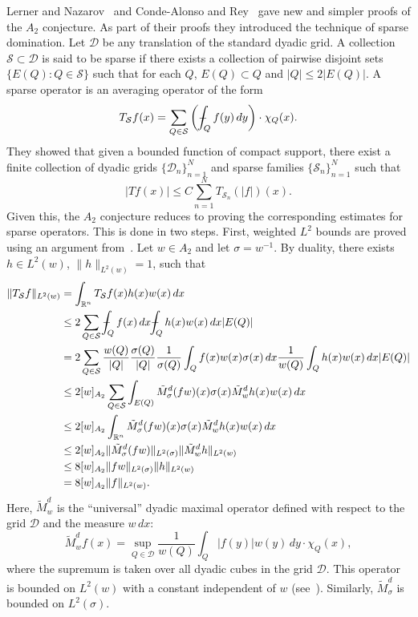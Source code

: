 \documentclass[12pt]{amsart}
\theoremstyle{definition}
\theoremstyle{remark}
\numberwithin{equation}{section}
\newcommand{\rn}{{{\mathbb R}^n}}
\newcommand{\D}{\mathcal D}
\newcommand{\Ss}{\mathcal S}
\def\Xint#1{\mathchoice
   {\XXint\displaystyle\textstyle{#1}}%
   {\XXint\textstyle\scriptstyle{#1}}%
   {\XXint\scriptstyle\scriptscriptstyle{#1}}%
   {\XXint\scriptscriptstyle\scriptscriptstyle{#1}}%
   \!\int}
\def\XXint#1#2#3{{\setbox0=\hbox{$#1{#2#3}{\int}$}
     \vcenter{\hbox{$#2#3$}}\kern-.5\wd0}}
\def\avgint{\Xint-}
\begin{document}
Lerner and Nazarov~\cite{lerner-IMRN2012,MR3127380,MR4007575} and
Conde-Alonso and Rey~\cite{MR3521084} gave 
new and simpler proofs of the $A_2$ conjecture.  As part of their proofs
they introduced the technique of sparse domination.  Let
$\D$ be any translation of the standard dyadic grid.  A collection $\Ss\subset
\D$ is said to be sparse if there exists a collection of pairwise
disjoint sets $\{ E(Q) : Q \in \Ss \}$ such that for each $Q$, $E(Q)
\subset Q$ and $|Q|\leq 2|E(Q)|$.   A sparse operator is an averaging
operator of the form
%
\[ T_{\Ss}f(x) = \sum_{Q\in \Ss} \left( \avgint_Q
  f(y)\,dy\right)\cdot \chi_Q(x). \]
%
They showed that given a bounded function of compact support, there
exist a finite collection of dyadic grids $\{\D_n\}_{n=1}^N$ and
sparse families $\{\Ss_n\}_{n=1}^N$ such that
%
\[  |Tf(x)| \leq C \sum_{n=1}^N T_{\Ss_n}(|f|)(x).  \]
% 
Given this, the $A_2$ conjecture reduces to proving the corresponding
estimates for sparse operators.  This is done in two steps.  First,
weighted $L^2$ bounds are proved using an argument
from~\cite{dcu-martell-perez}.  Let $w\in A_2$ and let $\sigma=w^{-1}$.
By duality, there exists $h\in L^2(w)$, $\|h\|_{L^2(w)}=1$, such that
%
    \begin{align*}
       \|T_\Ss f\|_{L^2(w)}
       & = \int_{\rn} T_\Ss f(x) h(x) w(x)\,dx \\
   & \leq 2 \sum_{Q\in \Ss} \avgint_Q f(x)\,dx
       \avgint_Q h(x)w(x)\,dx |E(Q)| \\
  & = 2 \sum_{Q\in \Ss} \frac{w(Q)}{|Q|}\frac{\sigma(Q)}{|Q|}
     \frac{1}{\sigma(Q)}\int_Q f(x)w(x)\sigma(x)\,dx \frac{1}{w(Q)} \int_Q h(x)w(x)\,dx |E(Q)| \\
& \leq 2[w]_{A_2} \sum_{Q\in \Ss} \int_{E(Q)}
 \tilde{M}_\sigma^d (fw)(x) \sigma(x) \tilde{M}_w^dh(x) w(x) \,dx \\
& \leq 2[w]_{A_2} \int_\rn \tilde{M}_\sigma^d (fw)(x) \sigma(x) \tilde{M}_w^dh(x) w(x) \,dx \\
& \leq 2[w]_{A_2} \|\tilde{M}_\sigma^d (fw)\|_{L^2(\sigma)}
                 \|\tilde{M}_w^d h\|_{L^2(w)} \\ 
   & \leq 8[w]_{A_2} \|fw\|_{L^2(\sigma)}
        \| h\|_{L^2(w)} \\
 & = 8[w]_{A_2} \|f\|_{L^2(w)}. 
     \end{align*}
Here, $\tilde{M}_w^d$ is the ``universal'' dyadic maximal operator defined with respect to
the grid $\D$ and the measure $w\,dx$:
%
\[ \tilde{M}_w^d f(x) =\sup_{Q\in \D} \frac{1}{w(Q)}\int_Q
  |f(y)|w(y)\,dy \cdot \chi_Q(x),  \]
%
where the supremum is taken over all dyadic cubes in the grid $\D$.  This
operator is bounded on $L^2(w)$ with a constant independent of $w$
(see~\cite{garcia-cuerva-rubiodefrancia85}).  Similarly, $\tilde{M}_\sigma^d$
is bounded on $L^2(\sigma)$.
\end{document}
